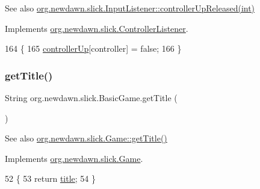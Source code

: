 \begin{DoxySeeAlso}{See also}
\mbox{\hyperlink{interfaceorg_1_1newdawn_1_1slick_1_1_controller_listener_a1342ad9ad1f7314b4eb10c20c21a9d50}{org.\+newdawn.\+slick.\+Input\+Listener\+::controller\+Up\+Released(int)}} 
\end{DoxySeeAlso}


Implements \mbox{\hyperlink{interfaceorg_1_1newdawn_1_1slick_1_1_controller_listener_a1342ad9ad1f7314b4eb10c20c21a9d50}{org.\+newdawn.\+slick.\+Controller\+Listener}}.


\begin{DoxyCode}
164                                                      \{
165         \mbox{\hyperlink{classorg_1_1newdawn_1_1slick_1_1_basic_game_ac57500e9873e5634ed07cdba8b9c1d58}{controllerUp}}[controller] = \textcolor{keyword}{false};
166     \}
\end{DoxyCode}
\mbox{\label{classorg_1_1newdawn_1_1slick_1_1_basic_game_aa0f5bd5f0a628ed27a9d39d759ade637}} 
\subsubsection{\texorpdfstring{get\+Title()}{getTitle()}}
{\footnotesize\ttfamily String org.\+newdawn.\+slick.\+Basic\+Game.\+get\+Title (\begin{DoxyParamCaption}{ }\end{DoxyParamCaption})\hspace{0.3cm}{\ttfamily [inline]}}

\begin{DoxySeeAlso}{See also}
\mbox{\hyperlink{interfaceorg_1_1newdawn_1_1slick_1_1_game_ae02a95991618c4aec2038d8d482be0d2}{org.\+newdawn.\+slick.\+Game\+::get\+Title()}} 
\end{DoxySeeAlso}


Implements \mbox{\hyperlink{interfaceorg_1_1newdawn_1_1slick_1_1_game_ae02a95991618c4aec2038d8d482be0d2}{org.\+newdawn.\+slick.\+Game}}.


\begin{DoxyCode}
52                              \{
53         \textcolor{keywordflow}{return} \mbox{\hyperlink{classorg_1_1newdawn_1_1slick_1_1_basic_game_a7d56224aca7f48d84cbd9f1d55cc5a70}{title}};
54     \}
\end{DoxyCode}
\mbox{\label{classorg_1_1newdawn_1_1slick_1_1_basic_game_a8af0900217e4d389249f71367b22d114}} 

